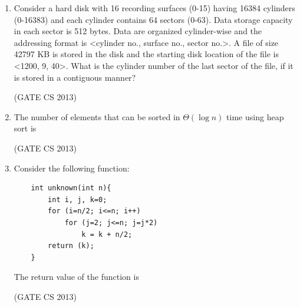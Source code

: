 \documentclass[a4paper, 11pt]{article}
\begin{document}
\begin{enumerate}
     \item Consider a hard disk with 16 recording surfaces (0-15) having 16384 cylinders (0-16383) and each cylinder contains 64 sectors (0-63). Data storage capacity in each sector is 512 bytes. Data are organized cylinder-wise and the addressing format is <cylinder no., surface no., sector no.>. A file of size 42797 KB is stored in the disk and the starting disk location of the file is <1200, 9, 40>. What is the cylinder number of the last sector of the file, if it is stored in a contiguous manner? 
     \begin{enumerate}
     \end{enumerate}

     \hfill (GATE CS 2013)

     \item The number of elements that can be sorted in $\Theta(\log n)$ time using heap sort is
     \begin{enumerate}
     \end{enumerate}

\hfill (GATE CS 2013)

     \item Consider the following function:
     \begin{lstlisting}
    int unknown(int n){
        int i, j, k=0;
        for (i=n/2; i<=n; i++)
            for (j=2; j<=n; j=j*2)
                k = k + n/2;
        return (k);
    } 
    \end{lstlisting}
     The return value of the function is
     \begin{enumerate}
     \end{enumerate}
     \hfill (GATE CS 2013)


\end{enumerate}
\end{document}
